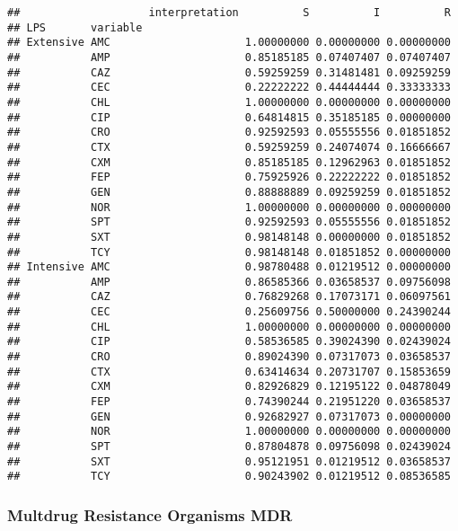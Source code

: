 \documentclass[
]{article}
\begin{document}
\begin{verbatim}
##                    interpretation          S          I          R
## LPS       variable                                                
## Extensive AMC                     1.00000000 0.00000000 0.00000000
##           AMP                     0.85185185 0.07407407 0.07407407
##           CAZ                     0.59259259 0.31481481 0.09259259
##           CEC                     0.22222222 0.44444444 0.33333333
##           CHL                     1.00000000 0.00000000 0.00000000
##           CIP                     0.64814815 0.35185185 0.00000000
##           CRO                     0.92592593 0.05555556 0.01851852
##           CTX                     0.59259259 0.24074074 0.16666667
##           CXM                     0.85185185 0.12962963 0.01851852
##           FEP                     0.75925926 0.22222222 0.01851852
##           GEN                     0.88888889 0.09259259 0.01851852
##           NOR                     1.00000000 0.00000000 0.00000000
##           SPT                     0.92592593 0.05555556 0.01851852
##           SXT                     0.98148148 0.00000000 0.01851852
##           TCY                     0.98148148 0.01851852 0.00000000
## Intensive AMC                     0.98780488 0.01219512 0.00000000
##           AMP                     0.86585366 0.03658537 0.09756098
##           CAZ                     0.76829268 0.17073171 0.06097561
##           CEC                     0.25609756 0.50000000 0.24390244
##           CHL                     1.00000000 0.00000000 0.00000000
##           CIP                     0.58536585 0.39024390 0.02439024
##           CRO                     0.89024390 0.07317073 0.03658537
##           CTX                     0.63414634 0.20731707 0.15853659
##           CXM                     0.82926829 0.12195122 0.04878049
##           FEP                     0.74390244 0.21951220 0.03658537
##           GEN                     0.92682927 0.07317073 0.00000000
##           NOR                     1.00000000 0.00000000 0.00000000
##           SPT                     0.87804878 0.09756098 0.02439024
##           SXT                     0.95121951 0.01219512 0.03658537
##           TCY                     0.90243902 0.01219512 0.08536585
\end{verbatim}

\hypertarget{multdrug-resistance-organisms-mdr}{%
\subsubsection{Multdrug Resistance Organisms
MDR}\label{multdrug-resistance-organisms-mdr}}
\end{document}
